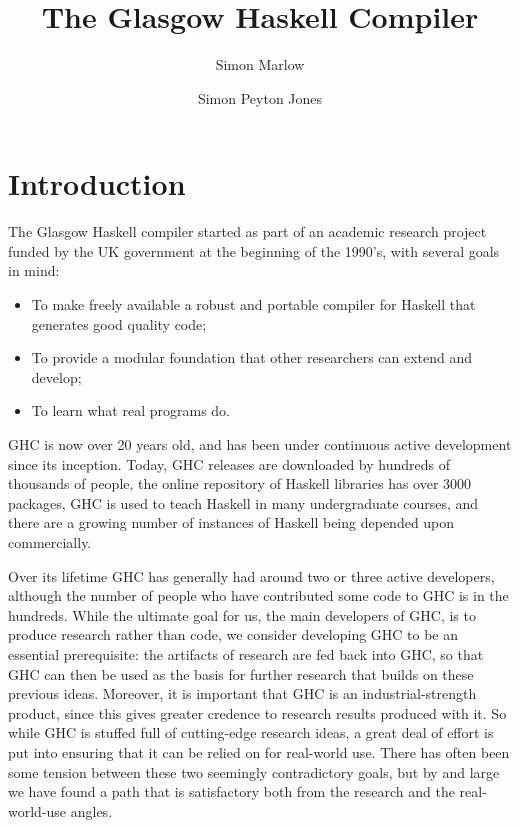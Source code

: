\documentclass{article}
\title{The Glasgow Haskell Compiler}
\author{Simon Marlow \and Simon Peyton Jones}
\begin{document}
\maketitle

\makeatactive
\section{Introduction}

The Glasgow Haskell compiler started as part of an academic research
project funded by the UK government at the beginning of the 1990's,
with several goals in mind:

\begin{itemize}

\item To make freely available a robust and portable compiler for
    Haskell that generates good quality code;

\item To provide a modular foundation that other researchers can
  extend and develop;

\item To learn what real programs do.

\end{itemize}

GHC is now over 20 years old, and has been under continuous active
development since its inception.  Today, GHC releases are downloaded
by hundreds of thousands of people, the online repository of Haskell
libraries has over 3000 packages, GHC is used to teach Haskell in
many undergraduate courses, and there are a growing number of
instances of Haskell being depended upon commercially.

Over its lifetime GHC has generally had around two or three active
developers, although the number of people who have contributed some
code to GHC is in the hundreds.  While the ultimate goal for us, the
main developers of GHC, is to produce research rather than code, we
consider developing GHC to be an essential prerequisite: the artifacts
of research are fed back into GHC, so that GHC can then be used as the
basis for further research that builds on these previous ideas.
Moreover, it is important that GHC is an industrial-strength product,
since this gives greater credence to research results produced with
it.  So while GHC is stuffed full of cutting-edge research ideas, a
great deal of effort is put into ensuring that it can be relied on for
real-world use.  There has often been some tension between these two
seemingly contradictory goals, but by and large we have found a path
that is satisfactory both from the research and the real-world-use
angles.
\end{document}
